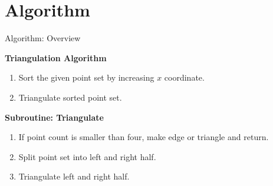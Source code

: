 \documentclass[aspectratio=169,fleqn]{beamer}
\begin{document}
\section{Algorithm}
  \begin{frame}{Algorithm: Overview}
      \onslide<+->
      \onslide<+->
      \begin{mybox}
        \textbf{Triangulation Algorithm}
        \begin{enumerate}
          \item<+-> Sort the given point set by increasing $x$ coordinate.
          \item<+-> Triangulate sorted point set.
        \end{enumerate}
      \end{mybox}%
      \bigskip
    \bigskip
      \onslide<+->
      \begin{mybox}
        \textbf{Subroutine: Triangulate}
        \begin{enumerate}
          \item<+-> If point count is smaller than four, make edge or triangle and return.
          \item<+-> Split point set into left and right half.
          \item<+-> Triangulate left and right half.

\end{enumerate}
\end{mybox}
\end{frame}
\end{document}
